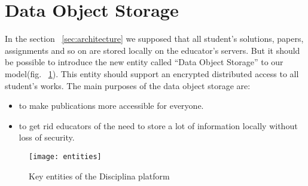 \appendix
\section{Data Object Storage}

In the section ~\ref{sec:architecture} we supposed that all student's solutions, papers, assignments and so on are stored locally on the educator's servers. But it should be possible to introduce the new entity called ``Data Object Storage'' to our model(fig. ~\ref{fig:entities-object-storage}). This entity should support an encrypted distributed access to all student's works. The main purposes of the data object storage are:
\begin{itemize}
\item to make publications more accessible for everyone.
\item to get rid educators of the need to store a lot of information locally without loss of security.
\end{itemize}

\begin{figure}[ht]
\centering
\texttt{[image: entities]}
\caption{Key entities of the Disciplina platform}
\label{fig:entities-object-storage}
\end{figure}

